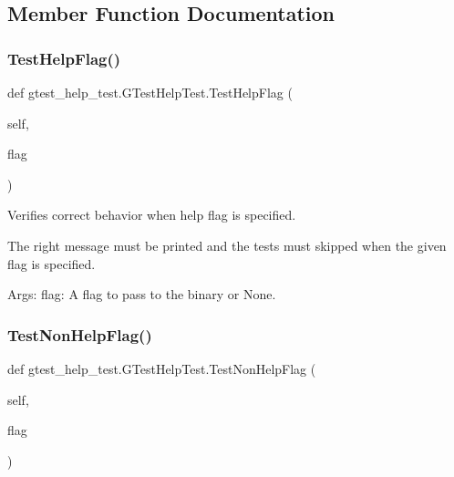 \subsection{Member Function Documentation}
\mbox{\label{classgtest__help__test_1_1_g_test_help_test_a26cc1a64bd67278252ebfcd0ac0dca0c}} 
\subsubsection{\texorpdfstring{TestHelpFlag()}{TestHelpFlag()}}
{\footnotesize\ttfamily def gtest\+\_\+help\+\_\+test.\+G\+Test\+Help\+Test.\+Test\+Help\+Flag (\begin{DoxyParamCaption}\item[{}]{self,  }\item[{}]{flag }\end{DoxyParamCaption})}

\begin{DoxyVerb}Verifies correct behavior when help flag is specified.

The right message must be printed and the tests must
skipped when the given flag is specified.

Args:
  flag:  A flag to pass to the binary or None.
\end{DoxyVerb}
 \mbox{\label{classgtest__help__test_1_1_g_test_help_test_a03ffa91ecf6193ed2ed80b53933112ab}} 
\subsubsection{\texorpdfstring{TestNonHelpFlag()}{TestNonHelpFlag()}}
{\footnotesize\ttfamily def gtest\+\_\+help\+\_\+test.\+G\+Test\+Help\+Test.\+Test\+Non\+Help\+Flag (\begin{DoxyParamCaption}\item[{}]{self,  }\item[{}]{flag }\end{DoxyParamCaption})}

